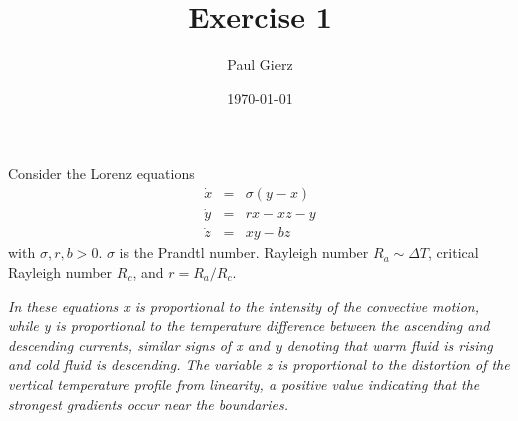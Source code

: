\documentclass[a4paper,12pt]{article}
\title{Exercise 1}
\author{Paul Gierz}
\date{\today}
\begin{document}
\maketitle
\thispagestyle{fancy}
%
Consider the Lorenz equations
\begin{eqnarray*}
\dot{x} & = & \sigma(y-x)\\
\dot{y} & = & r x - x z -y\\
\dot{z} & = & xy - b z
\end{eqnarray*}
with $\sigma, r, b >0$.
$ \sigma $   is the Prandtl number.
Rayleigh number  $ R_a \sim \Delta T$,  critical Rayleigh number $R_c$, and $  r=R_a/R_c   $.

{\it In these equations x is proportional to the intensity of the convective motion, while y is proportional to the temperature difference between the ascending and descending currents, similar signs of x and y denoting that warm fluid is rising and cold fluid is descending. The variable z is proportional to the distortion of the vertical temperature profile from linearity, a positive value indicating that the strongest gradients occur near the boundaries. }
 
\end{document}
